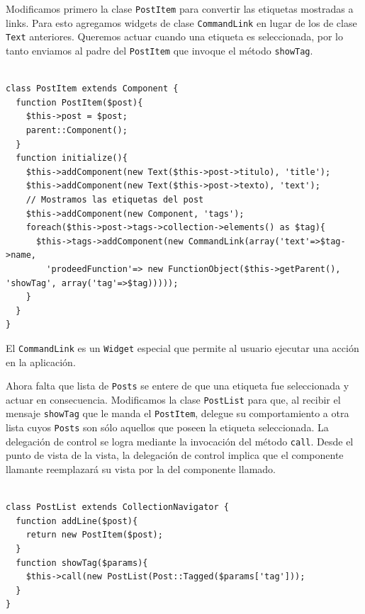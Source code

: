 
Modificamos primero la clase \verb"PostItem" para convertir las etiquetas mostradas a links. Para esto agregamos widgets de clase \verb"CommandLink" en lugar de los de clase \verb"Text" anteriores. Queremos actuar cuando una etiqueta es seleccionada, por lo tanto enviamos al padre del \verb'PostItem' que invoque el método \verb'showTag'.

\begin{verbatim}

class PostItem extends Component {
  function PostItem($post){
    $this->post = $post;
    parent::Component();
  }
  function initialize(){
    $this->addComponent(new Text($this->post->titulo), 'title');
    $this->addComponent(new Text($this->post->texto), 'text');
    // Mostramos las etiquetas del post
    $this->addComponent(new Component, 'tags');
    foreach($this->post->tags->collection->elements() as $tag){
      $this->tags->addComponent(new CommandLink(array('text'=>$tag->name,
        'prodeedFunction'=> new FunctionObject($this->getParent(), 'showTag', array('tag'=>$tag)))));
    }
  }
}

\end{verbatim}

El \verb"CommandLink" es un \verb"Widget" especial que permite al usuario ejecutar una acción en la aplicación.

Ahora falta que lista de \verb"Posts" se entere de que una etiqueta fue seleccionada y actuar en consecuencia. Modificamos la clase \verb"PostList" para que, al recibir el mensaje \verb'showTag' que le manda el \verb'PostItem', delegue su comportamiento a otra lista cuyos \verb"Posts" son sólo aquellos que poseen la etiqueta seleccionada. La delegación de control se logra mediante la invocación del método \verb"call". Desde el punto de vista de la vista, la delegación de control implica que el componente llamante reemplazará su vista por la del componente llamado.

\begin{verbatim}

class PostList extends CollectionNavigator {
  function addLine($post){
    return new PostItem($post);
  }
  function showTag($params){
    $this->call(new PostList(Post::Tagged($params['tag']));
  }
}

\end{verbatim}



